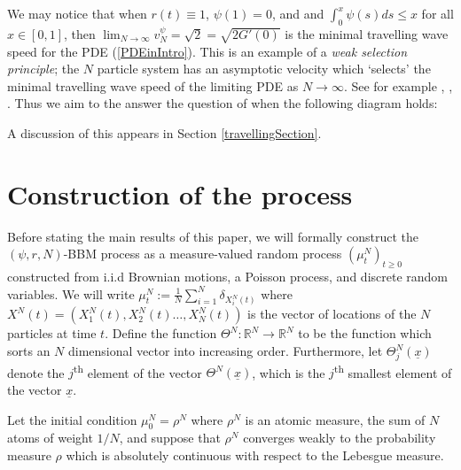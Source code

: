 \documentclass{article}
\newcommand{\B}[1]{\mathbb{#1}}
\begin{document}
We may notice that when $r(t)\equiv 1$, $\psi(1)=0$, and and $\int_0^x \psi(s)ds \leq x$ for all $x\in [0,1]$, then $\lim_{N\to\infty}v^\psi_N=\sqrt{2}=\sqrt{2G'(0)}$ is the minimal travelling wave speed for the PDE (\ref{PDEinIntro}). This is an example of a \textit{weak selection principle}; the $N$ particle system has an asymptotic velocity which `selects' the minimal travelling wave speed of the limiting PDE as $N\to\infty$. See for example \cite{toughBeres}, \cite{hydroNBBM}, \cite{sameSelec}. Thus we aim to the answer the question of when the following diagram holds:
\begin{center}\end{center}
A discussion of this appears in Section \ref{travellingSection}.

\section{Construction of the process} \label{constructionSection}

Before stating the main results of this paper, we will formally construct the $(\psi,r,N)$-BBM process as a measure-valued random process $(\mu^N_t)_{t\geq 0}$ constructed from i.i.d Brownian motions, a Poisson process, and discrete random variables. We will write $\mu_t^N:=\frac1N \sum_{i=1}^N \delta_{X_i^N(t)}$ where $X^N(t)=(X_1^N(t),X_2^N(t)\ldots,X_N^N(t))$ is the vector of locations of the $N$ particles at time $t$. Define the function $\Theta^N:\B{R}^N\to\B{R}^N$ to be the function which sorts an $N$ dimensional vector into increasing order. Furthermore, let $\Theta^N_j(\underline{x})$ denote the $j$\textsuperscript{th} element of the vector $\Theta^N(\underline{x})$, which is the $j$\textsuperscript{th }smallest element of the vector $\underline{x}$.

Let the initial condition $\mu^N_0=\rho^N$ where $\rho^N$ is an atomic measure, the sum of $N$ atoms of weight $1/N$, and suppose that $\rho^N$ converges weakly to the probability measure $\rho$ which is absolutely continuous with respect to the Lebesgue measure.
\end{document}
